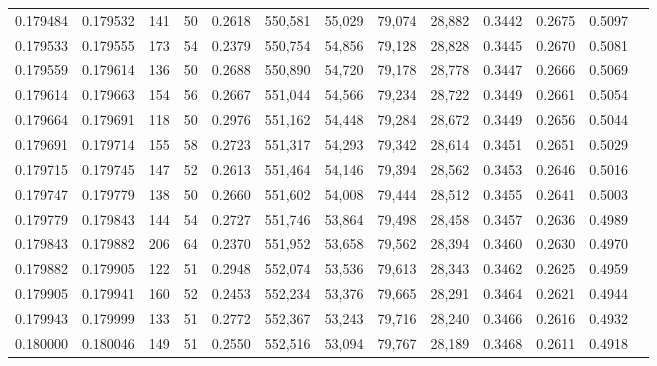 \begin{tabular}{rrrrrrrrrrrrr}
0.179484 & 0.179532 &   141 &  50 &                                     0.2618 & 550,581 &  55,029 &  79,074 &  28,882 & 0.3442 & 0.2675 & 0.5097 \\
0.179533 & 0.179555 &   173 &  54 &                                     0.2379 & 550,754 &  54,856 &  79,128 &  28,828 & 0.3445 & 0.2670 & 0.5081 \\
0.179559 & 0.179614 &   136 &  50 &                                     0.2688 & 550,890 &  54,720 &  79,178 &  28,778 & 0.3447 & 0.2666 & 0.5069 \\
0.179614 & 0.179663 &   154 &  56 &                                     0.2667 & 551,044 &  54,566 &  79,234 &  28,722 & 0.3449 & 0.2661 & 0.5054 \\
0.179664 & 0.179691 &   118 &  50 &                                     0.2976 & 551,162 &  54,448 &  79,284 &  28,672 & 0.3449 & 0.2656 & 0.5044 \\
0.179691 & 0.179714 &   155 &  58 &                                     0.2723 & 551,317 &  54,293 &  79,342 &  28,614 & 0.3451 & 0.2651 & 0.5029 \\
0.179715 & 0.179745 &   147 &  52 &                                     0.2613 & 551,464 &  54,146 &  79,394 &  28,562 & 0.3453 & 0.2646 & 0.5016 \\
0.179747 & 0.179779 &   138 &  50 &                                     0.2660 & 551,602 &  54,008 &  79,444 &  28,512 & 0.3455 & 0.2641 & 0.5003 \\
0.179779 & 0.179843 &   144 &  54 &                                     0.2727 & 551,746 &  53,864 &  79,498 &  28,458 & 0.3457 & 0.2636 & 0.4989 \\
0.179843 & 0.179882 &   206 &  64 &                                     0.2370 & 551,952 &  53,658 &  79,562 &  28,394 & 0.3460 & 0.2630 & 0.4970 \\
0.179882 & 0.179905 &   122 &  51 &                                     0.2948 & 552,074 &  53,536 &  79,613 &  28,343 & 0.3462 & 0.2625 & 0.4959 \\
0.179905 & 0.179941 &   160 &  52 &                                     0.2453 & 552,234 &  53,376 &  79,665 &  28,291 & 0.3464 & 0.2621 & 0.4944 \\
0.179943 & 0.179999 &   133 &  51 &                                     0.2772 & 552,367 &  53,243 &  79,716 &  28,240 & 0.3466 & 0.2616 & 0.4932 \\
0.180000 & 0.180046 &   149 &  51 &                                     0.2550 & 552,516 &  53,094 &  79,767 &  28,189 & 0.3468 & 0.2611 & 0.4918 \\

\end{tabular}
